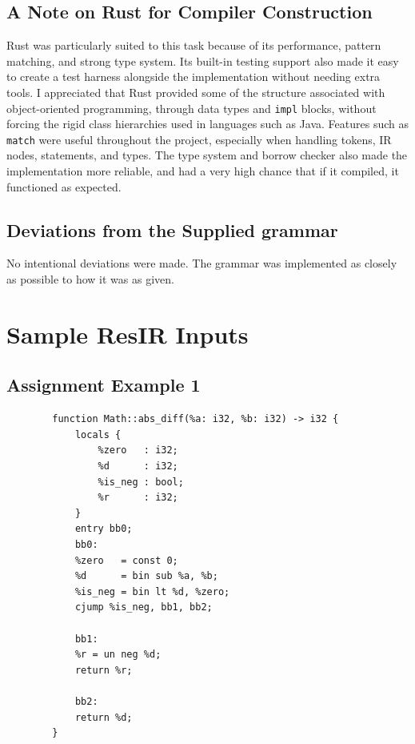 \documentclass[11pt,a4paper,oneside]{report}
\begin{document}
	
	\section{A Note on Rust for Compiler Construction}
	
	Rust was particularly suited to this task because of its performance, pattern matching, and strong type system. Its built-in testing support also made it easy to create a test harness alongside the implementation without needing extra tools. I appreciated that Rust provided some of the structure associated with object-oriented programming, through data types and \texttt{impl} blocks, without forcing the rigid class hierarchies used in languages such as Java. Features such as \texttt{match} were useful throughout the project, especially when handling tokens, IR nodes, statements, and types. The type system and borrow checker also made the implementation more reliable, and had a very high chance that if it compiled, it functioned as expected.\cite{rustdoc}
	
	\section{Deviations from the Supplied grammar}
	
	No intentional deviations were made. The grammar was implemented as closely as possible to how it was as given.
	
	
	
	\appendix
	
	\chapter{Sample ResIR Inputs}
	
	\section{Assignment Example 1}
	\begin{lstlisting}
		function Math::abs_diff(%a: i32, %b: i32) -> i32 {
			locals {
				%zero	: i32;
				%d		: i32;
				%is_neg : bool;
				%r		: i32;
			}
			entry bb0;
			bb0:
			%zero   = const 0;
			%d  	= bin sub %a, %b;
			%is_neg = bin lt %d, %zero;
			cjump %is_neg, bb1, bb2;
			
			bb1:
			%r = un neg %d;
			return %r;
			
			bb2:
			return %d;
		}
	\end{lstlisting}
\end{document}
